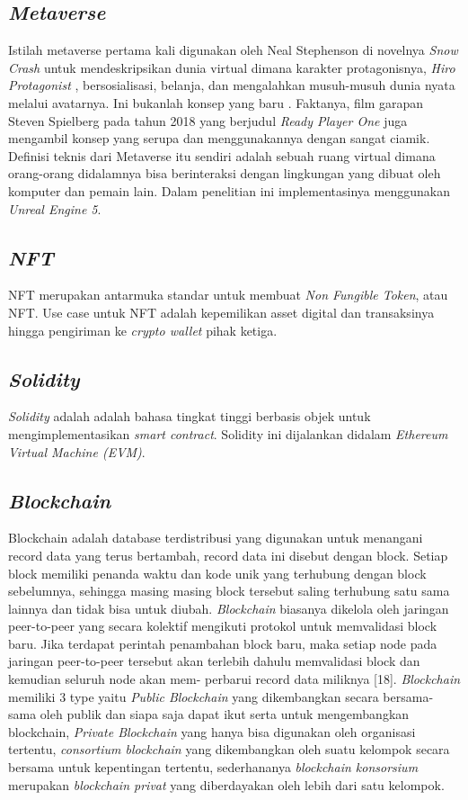 \subsection{\emph{Metaverse}}

Istilah metaverse pertama kali digunakan oleh Neal Stephenson di novelnya \emph{Snow Crash} untuk
mendeskripsikan dunia virtual dimana karakter protagonisnya, \emph{Hiro Protagonist}
, bersosialisasi, belanja, dan mengalahkan musuh-musuh dunia nyata melalui avatarnya. Ini bukanlah konsep yang baru
. Faktanya, film garapan Steven Spielberg pada tahun 2018 yang berjudul \emph{Ready Player One} juga mengambil konsep yang serupa dan
menggunakannya dengan sangat ciamik. Definisi teknis dari Metaverse itu sendiri adalah sebuah ruang virtual dimana orang-orang didalamnya bisa berinteraksi 
dengan lingkungan yang dibuat oleh komputer dan pemain lain. Dalam penelitian ini implementasinya menggunakan
\emph{Unreal Engine 5}.

\subsection{\emph{NFT}}
NFT merupakan antarmuka standar untuk membuat \emph{Non Fungible Token}, atau NFT.
Use case untuk NFT adalah kepemilikan asset digital dan transaksinya hingga pengiriman ke 
\emph{crypto wallet} pihak ketiga.

\subsection{\emph{Solidity}}
\emph{Solidity} adalah adalah bahasa tingkat tinggi berbasis objek untuk mengimplementasikan
\emph{smart contract}. Solidity ini dijalankan didalam \emph{Ethereum Virtual Machine (EVM)}.


\subsection{\emph{Blockchain}}

Blockchain adalah database terdistribusi yang digunakan
untuk menangani record data yang terus bertambah, record data ini
disebut dengan block. Setiap block memiliki penanda waktu dan
kode unik yang terhubung dengan block sebelumnya, sehingga masing
masing block tersebut saling terhubung satu sama lainnya dan 
tidak bisa untuk diubah. \emph{Blockchain} biasanya dikelola oleh jaringan
peer-to-peer yang secara kolektif mengikuti protokol untuk 
memvalidasi block baru. Jika terdapat perintah penambahan block baru,
maka setiap node pada jaringan peer-to-peer tersebut akan terlebih
dahulu memvalidasi block dan kemudian seluruh node akan mem-
perbarui record data miliknya [18]. \emph{Blockchain} memiliki 3 type \parencite{url:blockchaintype}
yaitu \emph{Public Blockchain} yang dikembangkan secara bersama-sama
oleh publik dan siapa saja dapat ikut serta untuk mengembangkan 
blockchain, \emph{Private Blockchain} yang hanya bisa digunakan oleh
organisasi tertentu, \emph{consortium blockchain} yang dikembangkan oleh
suatu kelompok secara bersama untuk kepentingan tertentu, 
sederhananya \emph{blockchain konsorsium} merupakan \emph{blockchain privat} yang
diberdayakan oleh lebih dari satu kelompok.

